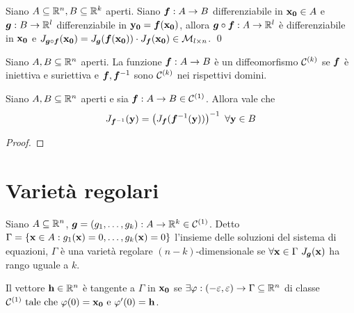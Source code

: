 \begin{theorem}
    Siano $A\subseteq \mathbb{R}^n, B \subseteq \mathbb{R}^k$ aperti. Siano $\bm f: A \to B$ differenziabile in $\vb{x_0} \in A$ e $\bm g:B \to \mathbb{R}^l$ differenziabile in $\vb{y_0} = \bm f(\vb{x_0})$, allora $\bm g \circ \bm f : A \to \mathbb{R}^l$ è differenziabile in $\vb{x_0}$ e $J_{\bm g \circ \bm f}(\vb{x_0})=J_{\bm g}(\bm f (\vb{x_0}))\cdot J_{\bm f}(\vb{x_0}) \in \mathcal{M}_{l\times n}$.
    \qed
\end{theorem}

\begin{definition}
    [Diffeomorfismo]
    Siano $A,B \subseteq \mathbb{R}^n$ aperti. La funzione $\bm f: A \to B$ è un diffeomorfismo $\mathcal{C}^{(k)}$ se $\bm f$ è iniettiva e suriettiva e $\bm f, \bm f^{-1}$ sono $\mathcal{C}^{(k)}$ nei rispettivi domini.
\end{definition}

\begin{theorem}
    Siano $A,B \subseteq \mathbb{R}^n$ aperti e sia $\bm f:A\to B \in \mathcal{C}^{(1)}$. Allora vale che
    $$
        J_{\bm f^{-1}}(\vb{y}) = \left(J_{\bm f}(\bm f^{-1}(\vb{y})) \right)^{-1} \ \forall \vb{y} \in B
    $$
\end{theorem}

\begin{proof}
\end{proof}

\section{Varietà regolari}

\begin{definition}
    Siano $A \subseteq \mathbb{R}^n$, $\bm g=(g_1,\dots,g_k):A\to\mathbb{R}^k \in \mathcal{C}^{(1)}$. Detto $\Gamma =\{\vb{x}\in A : g_1(\vb{x})=0,\dots,g_k(\vb{x})=0\}$ l'insieme delle soluzioni del sistema di equazioni, $\Gamma$ è una varietà regolare $(n-k)$-dimensionale se $\forall \vb{x} \in \Gamma \ J_{\bm g}(\vb{x})$ ha rango uguale a $k$.
\end{definition}

\begin{definition}
    Il vettore $\vb{h} \in \mathbb{R}^n$ è tangente a $\Gamma$ in $\vb{x_0}$ se $\exists \varphi: (-\varepsilon, \varepsilon) \to \Gamma \subseteq \mathbb{R}^n$ di classe $\mathcal{C}^{(1)} \text{ tale che } \varphi (0) = \vb{x_0} \text{ e } \varphi ' (0) = \vb{h}$.
\end{definition}

